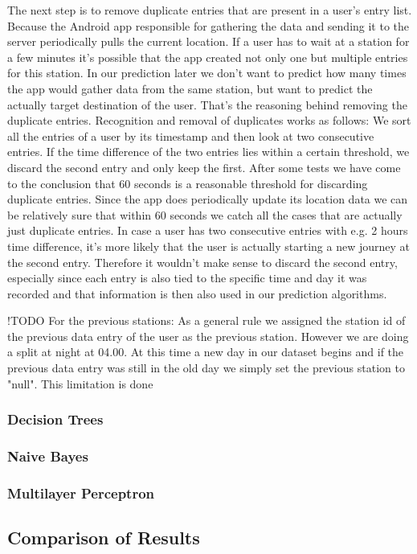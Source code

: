The next step is to remove duplicate entries that are present in a user's entry list. Because the Android app responsible for gathering the data and sending it to the server periodically pulls the current location. If a user has to wait at a station for a few minutes it's possible that the app created not only one but multiple entries for this station. In our prediction later we don't want to predict how many times the app would gather data from the same station, but want to predict the actually target destination of the user. That's the reasoning behind removing the duplicate entries. Recognition and removal of duplicates works as follows: 
We sort all the entries of a user by its timestamp and then look at two consecutive entries. If the time difference of the two entries lies within a certain threshold, we discard the second entry and only keep the first. After some tests we have come to the conclusion that 60 seconds is a reasonable threshold for discarding duplicate entries. Since the app does periodically update its location data we can be relatively sure that within 60 seconds we catch all the cases that are actually just duplicate entries. In case a user has two consecutive entries with e.g. 2 hours time difference, it's more likely that the user is actually starting a new journey at the second entry. Therefore it wouldn't make sense to discard the second entry, especially since each entry is also tied to the specific time and day it was recorded and that information is then also used in our prediction algorithms.




!TODO For the previous stations:
As a general rule we assigned the station id of the previous data entry of the user as the previous station. However we are doing a split at night at 04.00. At this time a new day in our dataset begins and if the previous data entry was still in the old day we simply set the previous station to "null". This limitation is done


\subsubsection{Decision Trees}
\subsubsection{Naive Bayes}
\subsubsection{Multilayer Perceptron}

\subsection{Comparison of Results}
